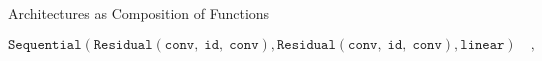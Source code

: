 \documentclass[main]{subfiles}
\begin{document}
\begin{frame}{Architectures as Composition of Functions}
\begin{center}

\end{center}
\begin{equation*}\label{eq:anae_example}
        \texttt{Sequential}(\texttt{Residual}(\texttt{conv},\;\texttt{id},\;\texttt{conv}),
        \texttt{Residual}(\texttt{conv},\;\texttt{id},\;\texttt{conv}),
        \texttt{linear}) \quad ,
\end{equation*}

\begin{center}
    
\begin{tikzpicture}[x=0.75pt,y=0.75pt,yscale=-1,xscale=1, scale=0.8]


\end{tikzpicture}
\end{center}
\end{frame}
\end{document}
